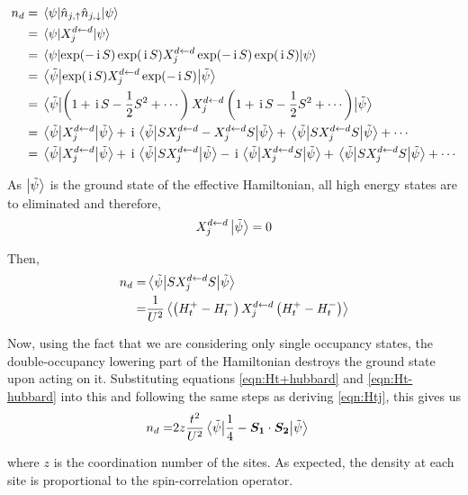 \documentclass[]{report}
\renewcommand{\vec}{\bm}
\newcommand{\I}{\,\mathrm{i}\,}
\begin{document}
\begin{align}
\nonumber
n_d &= \expval{ \hat{n}_{j,\uparrow} \hat{n}_{j,\downarrow} }{\psi}\\
\nonumber
&= \expval{X^{d \leftarrow d}_{j}}{\psi}\\
\nonumber
&= \expval{\exp(-\I S)\exp(\I S)X^{d \leftarrow d}_{j}\exp(-\I S)\exp(\I S)}{\psi}\\
\nonumber
&= \expval{\exp(\I S)X^{d \leftarrow d}_{j}\exp(-\I S)}{\tilde{\psi}}\\
\nonumber
&= \expval{\left( 1 + \I S - \frac{1}{2} S^2 + \cdots \right) X^{d \leftarrow d}_{j} \left( 1 + \I S - \frac{1}{2} S^2 + \cdots \right) }{\tilde{\psi}}\\
\nonumber
&= \expval{X^{d \leftarrow d}_{j}}{\tilde{\psi}} + \I \expval{S X^{d \leftarrow d}_{j} - X^{d \leftarrow d}_{j} S}{\tilde{\psi}} + \expval{S X^{d \leftarrow d}_{j} S}{\tilde{\psi}} + \cdots\\
&= \expval{X^{d \leftarrow d}_{j}}{\tilde{\psi}} + \I \expval{S X^{d \leftarrow d}_{j}}{\tilde{\psi}} - \I \expval{X^{d \leftarrow d}_{j} S}{\tilde{\psi}} + \expval{S X^{d \leftarrow d}_{j} S}{\tilde{\psi}} + \cdots
\end{align}

As $ \ket{\tilde{\psi}} $ is the ground state of the effective Hamiltonian, all high energy states are to eliminated and therefore,
\begin{align}
X^{d \leftarrow d}_{j}\ket{\tilde{\psi} }= 0
\end{align}

Then,
\begin{align}
\nonumber
n_d 
=&
\expval{S X^{d \leftarrow d}_{j} S}{\tilde{\psi}}\\
=&
\frac{1}{U^2}\expval{\left(H^{+}_t - H^{-}_{t}\right)X^{d \leftarrow d}_{j}\left(H^{+}_t - H^{-}_{t}\right)}
\end{align}

Now, using the fact that we are considering only single occupancy states, the double-occupancy lowering part of the Hamiltonian destroys the ground state upon acting on it. Substituting equations \eqref{eqn:Ht+hubbard} and \eqref{eqn:Ht-hubbard} into this and following the same steps as deriving \eqref{eqn:Htj}, this gives us
\begin{align}
\nonumber
n_d =&
2z\frac{t^2}{U^2} \expval{\frac{1}{4} - \vec{S_{1}}\cdot\vec{S_{2}}}{\tilde{\psi}}
\end{align}

where $ z $ is the coordination number of the sites. As expected, the density at each site is proportional to the spin-correlation operator.
\end{document}

